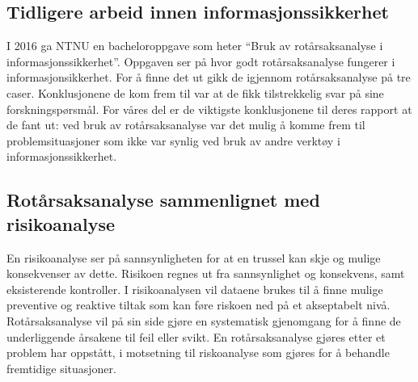 \subsection{Tidligere arbeid innen informasjonssikkerhet}
I 2016 ga NTNU en bacheloroppgave som heter ``Bruk av rotårsaksanalyse i informasjonssikkerhet''\cite{RCARapport}. Oppgaven ser på hvor godt rotårsaksanalyse fungerer i informasjonsikkerhet. For å finne det ut gikk de igjennom rotårsaksanalyse på tre caser. Konklusjonene de kom frem til var at de fikk tilstrekkelig svar på sine forskningspørsmål. For våres del er de viktigste konklusjonene til deres rapport\cite{RCARapport} at de fant ut: ved bruk av rotårsaksanalyse var det mulig å komme frem til problemsituasjoner som ikke var synlig ved bruk av andre verktøy i informasjonssikkerhet.  

\subsection{Rotårsaksanalyse sammenlignet med risikoanalyse}
En risikoanalyse ser på sannsynligheten for at en trussel kan skje og mulige konsekvenser av dette. Risikoen regnes ut fra sannsynlighet og konsekvens, samt eksisterende kontroller. I risikoanalysen vil dataene brukes til å finne mulige preventive og reaktive tiltak som kan føre riskoen ned på et akseptabelt nivå. Rotårsaksanalyse vil på sin side gjøre en systematisk gjenomgang for å finne de underliggende årsakene til feil eller svikt. En rotårsaksanalyse gjøres etter et problem har oppstått, i motsetning til riskoanalyse som gjøres for å behandle fremtidige situasjoner. 